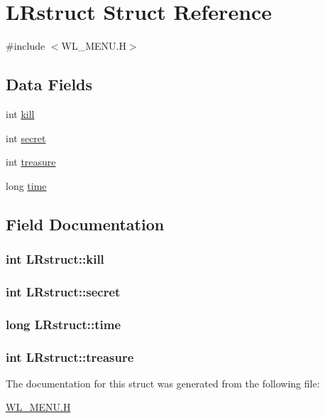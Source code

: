 \hypertarget{structLRstruct}{
\section{LRstruct Struct Reference}
\label{structLRstruct}
}


{\ttfamily \#include $<$WL\_\-MENU.H$>$}

\subsection*{Data Fields}
\begin{DoxyCompactItemize}
\item 
int \hyperlink{structLRstruct_a858b9e779962cf09ee0bcdea8517904a}{kill}
\item 
int \hyperlink{structLRstruct_affc1d161bcfcc5cb2bfd207be95d6b11}{secret}
\item 
int \hyperlink{structLRstruct_abe773a39757b30cda73d4a5141bec59e}{treasure}
\item 
long \hyperlink{structLRstruct_aa4c078ba2deb080029d8696a7757ebef}{time}
\end{DoxyCompactItemize}


\subsection{Field Documentation}
\hypertarget{structLRstruct_a858b9e779962cf09ee0bcdea8517904a}{
\subsubsection[{kill}]{\setlength{\rightskip}{0pt plus 5cm}int {\bf LRstruct::kill}}}
\label{structLRstruct_a858b9e779962cf09ee0bcdea8517904a}
\hypertarget{structLRstruct_affc1d161bcfcc5cb2bfd207be95d6b11}{
\subsubsection[{secret}]{\setlength{\rightskip}{0pt plus 5cm}int {\bf LRstruct::secret}}}
\label{structLRstruct_affc1d161bcfcc5cb2bfd207be95d6b11}
\hypertarget{structLRstruct_aa4c078ba2deb080029d8696a7757ebef}{
\subsubsection[{time}]{\setlength{\rightskip}{0pt plus 5cm}long {\bf LRstruct::time}}}
\label{structLRstruct_aa4c078ba2deb080029d8696a7757ebef}
\hypertarget{structLRstruct_abe773a39757b30cda73d4a5141bec59e}{
\subsubsection[{treasure}]{\setlength{\rightskip}{0pt plus 5cm}int {\bf LRstruct::treasure}}}
\label{structLRstruct_abe773a39757b30cda73d4a5141bec59e}


The documentation for this struct was generated from the following file:\begin{DoxyCompactItemize}
\item 
\hyperlink{WL__MENU_8H}{WL\_\-MENU.H}\end{DoxyCompactItemize}
